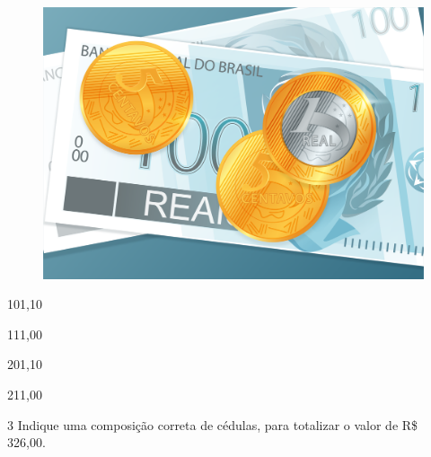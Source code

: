 \begin{figure}[htpb!]
\centering
\includegraphics[width=.5\textwidth]{./media/image79.png}
\end{figure}

\begin{escolha}[itemsep=-5pt]
\item 101,10

\item 111,00

\item 201,10

\item 211,00
\end{escolha}

\pagebreak
\num{3} Indique uma composição correta de cédulas, para totalizar o valor de R\$ 326,00.

